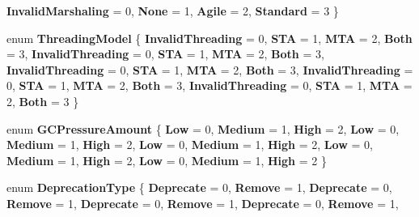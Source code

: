 \begin{DoxyCompactItemize}
{\bfseries Invalid\+Marshaling} = 0, 
{\bfseries None} = 1, 
{\bfseries Agile} = 2, 
{\bfseries Standard} = 3
 \}
\item 
\mbox{\label{namespace_windows_1_1_foundation_1_1_metadata_a4b7486fa60d9faccd8b65757f42b1aa1}} 
enum {\bfseries Threading\+Model} \{ \newline
{\bfseries Invalid\+Threading} = 0, 
{\bfseries S\+TA} = 1, 
{\bfseries M\+TA} = 2, 
{\bfseries Both} = 3, 
\newline
{\bfseries Invalid\+Threading} = 0, 
{\bfseries S\+TA} = 1, 
{\bfseries M\+TA} = 2, 
{\bfseries Both} = 3, 
\newline
{\bfseries Invalid\+Threading} = 0, 
{\bfseries S\+TA} = 1, 
{\bfseries M\+TA} = 2, 
{\bfseries Both} = 3, 
\newline
{\bfseries Invalid\+Threading} = 0, 
{\bfseries S\+TA} = 1, 
{\bfseries M\+TA} = 2, 
{\bfseries Both} = 3, 
\newline
{\bfseries Invalid\+Threading} = 0, 
{\bfseries S\+TA} = 1, 
{\bfseries M\+TA} = 2, 
{\bfseries Both} = 3
 \}
\item 
\mbox{\label{namespace_windows_1_1_foundation_1_1_metadata_a877de1cc5a89f9df6ace56ccf9883aa4}} 
enum {\bfseries G\+C\+Pressure\+Amount} \{ \newline
{\bfseries Low} = 0, 
{\bfseries Medium} = 1, 
{\bfseries High} = 2, 
{\bfseries Low} = 0, 
\newline
{\bfseries Medium} = 1, 
{\bfseries High} = 2, 
{\bfseries Low} = 0, 
{\bfseries Medium} = 1, 
\newline
{\bfseries High} = 2, 
{\bfseries Low} = 0, 
{\bfseries Medium} = 1, 
{\bfseries High} = 2, 
\newline
{\bfseries Low} = 0, 
{\bfseries Medium} = 1, 
{\bfseries High} = 2
 \}
\item 
\mbox{\label{namespace_windows_1_1_foundation_1_1_metadata_a6012664166c4aca6e08f2f623e42d611}} 
enum {\bfseries Deprecation\+Type} \{ \newline
{\bfseries Deprecate} = 0, 
{\bfseries Remove} = 1, 
{\bfseries Deprecate} = 0, 
{\bfseries Remove} = 1, 
\newline
{\bfseries Deprecate} = 0, 
{\bfseries Remove} = 1, 
{\bfseries Deprecate} = 0, 
{\bfseries Remove} = 1, 
\newline

\end{DoxyCompactItemize}
